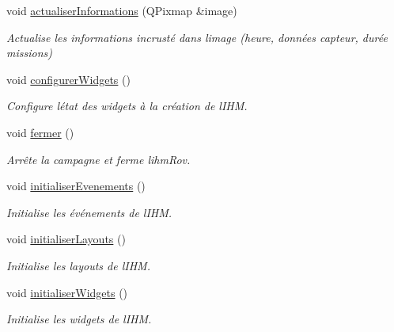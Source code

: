 \begin{DoxyCompactItemize}
\item 
void \hyperlink{class_i_h_m_rov_a58ba3661c111c9ab2d6f1e3c52f4ec21}{actualiser\+Informations} (Q\+Pixmap \&image)
\begin{DoxyCompactList}\small\item\em Actualise les informations incrusté dans l\textquotesingle{}image (heure, données capteur, durée missions) \end{DoxyCompactList}\item 
void \hyperlink{class_i_h_m_rov_aba47130fb875a01eefa09bc875affe6c}{configurer\+Widgets} ()
\begin{DoxyCompactList}\small\item\em Configure l\textquotesingle{}état des widgets à la création de l\textquotesingle{}I\+HM. \end{DoxyCompactList}\item 
void \hyperlink{class_i_h_m_rov_ac0c8c09dc2ef1c06e1008647dcd2d6b8}{fermer} ()
\begin{DoxyCompactList}\small\item\em Arrête la campagne et ferme l\textquotesingle{}ihm\+Rov. \end{DoxyCompactList}\item 
void \hyperlink{class_i_h_m_rov_a61e34efc084bba9934bce0d91448ea04}{initialiser\+Evenements} ()
\begin{DoxyCompactList}\small\item\em Initialise les événements de l\textquotesingle{}I\+HM. \end{DoxyCompactList}\item 
void \hyperlink{class_i_h_m_rov_aa900473297415bf43a13c4152034135a}{initialiser\+Layouts} ()
\begin{DoxyCompactList}\small\item\em Initialise les layouts de l\textquotesingle{}I\+HM. \end{DoxyCompactList}\item 
void \hyperlink{class_i_h_m_rov_a77d08efdfc3292d215af4df0e1af33a8}{initialiser\+Widgets} ()
\begin{DoxyCompactList}\small\item\em Initialise les widgets de l\textquotesingle{}I\+HM. \end{DoxyCompactList}\end{DoxyCompactItemize}
